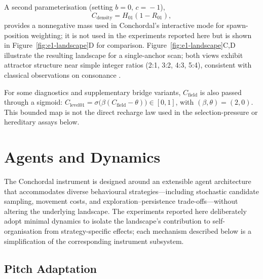 \documentclass[letterpaper]{article}
\begin{document}
A second parameterisation (setting $b\!=\!0,\,c\!=\!-1$),
%
\begin{equation}
  C_{\text{density}} = H_{01}(1 - R_{01}),
  \label{eq:c-density}
\end{equation}
%
provides a nonnegative mass used in Conchordal's interactive mode for spawn-position weighting; it is not used in the experiments reported here but is shown in Figure~\ref{fig:e1-landscape}D for comparison. Figure~\ref{fig:e1-landscape}C,D illustrate the resulting landscape for a single-anchor scan; both views exhibit attractor structure near simple integer ratios (2:1, 3:2, 4:3, 5:4), consistent with classical observations on consonance \citep{helmholtz1877,sethares1993}.

For some diagnostics and supplementary bridge variants, $C_{\text{field}}$ is also passed through a sigmoid: $C_{\text{level01}} = \sigma\!\bigl(\beta(C_{\text{field}}-\theta)\bigr)\in[0,1]$, with $(\beta,\theta)=(2,0)$. This bounded map is not the direct recharge law used in the selection-pressure or hereditary assays below.

\section{Agents and Dynamics}

The Conchordal instrument is designed around an extensible agent architecture that accommodates diverse behavioural strategies---including stochastic candidate sampling, movement costs, and exploration--persistence trade-offs---without altering the underlying landscape. The experiments reported here deliberately adopt minimal dynamics to isolate the landscape's contribution to self-organisation from strategy-specific effects; each mechanism described below is a simplification of the corresponding instrument subsystem.

\subsection{Pitch Adaptation}
\label{sec:pitch-adapt}
\end{document}
